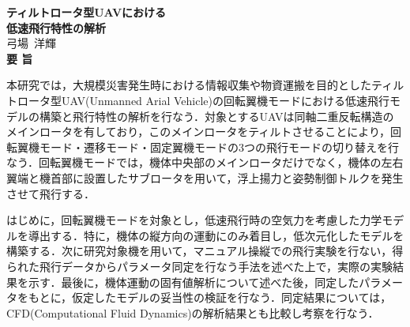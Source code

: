 
\begin{titlepage}
\begin{center}
{\LARGE \bf ティルトロータ型UAVにおける\\低速飛行特性の解析}
\\[0.5cm]
{\Large 弓場~洋輝}
\\[1.0cm]
{\LARGE \bf 要\vspace{36pt}   旨\\}
\end{center}

本研究では，大規模災害発生時における情報収集や物資運搬を目的としたティルトロータ型UAV(Unmanned Arial Vehicle)の回転翼機モードにおける低速飛行モデルの構築と飛行特性の解析を行なう．対象とするUAVは同軸二重反転構造のメインロータを有しており，このメインロータをティルトさせることにより，回転翼機モード・遷移モード・固定翼機モードの3つの飛行モードの切り替えを行なう．回転翼機モードでは，機体中央部のメインロータだけでなく，機体の左右翼端と機首部に設置したサブロータを用いて，浮上揚力と姿勢制御トルクを発生させて飛行する．

はじめに，回転翼機モードを対象とし，低速飛行時の空気力を考慮した力学モデルを導出する．特に，機体の縦方向の運動にのみ着目し，低次元化したモデルを構築する．次に研究対象機を用いて，マニュアル操縦での飛行実験を行ない，得られた飛行データからパラメータ同定を行なう手法を述べた上で，実際の実験結果を示す．最後に，機体運動の固有値解析について述べた後，同定したパラメータをもとに，仮定したモデルの妥当性の検証を行なう．同定結果については，CFD(Computational Fluid Dynamics)の解析結果とも比較し考察を行なう．

\end{titlepage}
